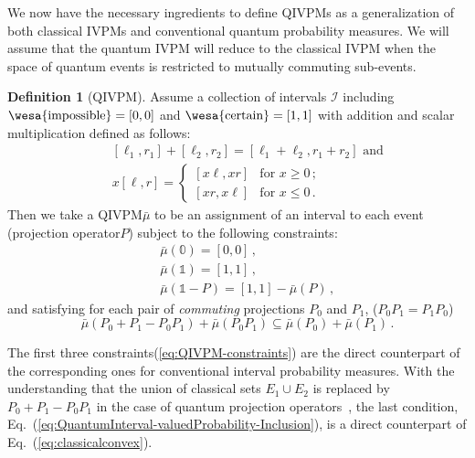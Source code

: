\documentclass[english,reprint, aps, prl,superscriptaddress, showpacs,
showkeys, longbibliography, amsmath, amssymb]{revtex4-1}
\theoremstyle{plain}
\theoremstyle{definition}
\newtheorem{definition}[thm]{Definition}
\newcommand{\imposs}{{\text{\wesa{impossible}}}}
\newcommand{\necess}{{\text{\wesa{certain}}}}
\newcommand{\nb}{\nolinebreak[1] }
\begin{document}
We now have the necessary ingredients to define QIVPMs as a
generalization of both classical IVPMs and conventional quantum
probability measures. We will assume that the quantum IVPM will reduce to
the classical IVPM when the space of quantum events is restricted to
mutually commuting sub-events.

\begin{definition}[QIVPM]
  Assume a collection of intervals $\mathscr{I}$ including
  $\imposs=[0,0]$ and $\necess=[1,1]$ with addition and scalar
  multiplication defined as follows:
  \begin{subequations}\label{eq:interval-operations}
  \begin{eqnarray}
   &  & [\ell_{1},r_{1}]+[\ell_{2},r_{2}]=[\ell_{1}+\ell_{2},r_{1}+r_{2}]\textrm{ and}\\
   &  & x[\ell,r]=\begin{cases}
  [x\ell,xr] & \textrm{for }x\ge0\,;\\{}
  [xr,x\ell] & \textrm{for }x\le0\,.
  \end{cases}
  \end{eqnarray}
  \end{subequations}
  Then we take a QIVPM\nb$\bar{\mu}$ to be an assignment of an interval to each
  event (projection operator\nb$P$) subject to the following constraints:
  \begin{subequations}\label{eq:QIVPM-constraints}
  \begin{eqnarray}
   &  & \bar{\mu}(\mathbb{0})=\left[0,0\right]\,,\\
   &  & \bar{\mu}(\mathbb{1})=\left[1,1\right]\,,\\
   &  & \bar{\mu}\left(\mathbb{1}-P\right)=\left[1,1\right]-\bar{\mu}\left(P\right)\,,
  \end{eqnarray}
  \end{subequations}
  and satisfying for each pair of \emph{commuting} projections $P_0$ and $P_1$,
  ($P_0P_1=P_1P_0$)
\begin{equation}
\bar{\mu}\left(P_{0}+P_{1}-P_{0}P_{1}\right)+\bar{\mu}\left(P_{0}P_{1}\right)\subseteq\bar{\mu}\left(P_{0}\right)+\bar{\mu}\left(P_{1}\right)\,.
\label{eq:QuantumInterval-valuedProbability-Inclusion}
\end{equation}
\end{definition}
The first three constraints\nb(\ref{eq:QIVPM-constraints}) are the direct
counterpart of the corresponding ones for conventional interval probability
measures.
With the understanding that the union of classical sets $E_1\cup E_2$ is replaced
by $P_0+P_1-P_0P_1$ in the case of quantum projection
operators~\cite{Griffiths2003}, the last condition, Eq.~(\ref{eq:QuantumInterval-valuedProbability-Inclusion}), is
a direct counterpart of Eq.~(\ref{eq:classicalconvex}).
\end{document}
